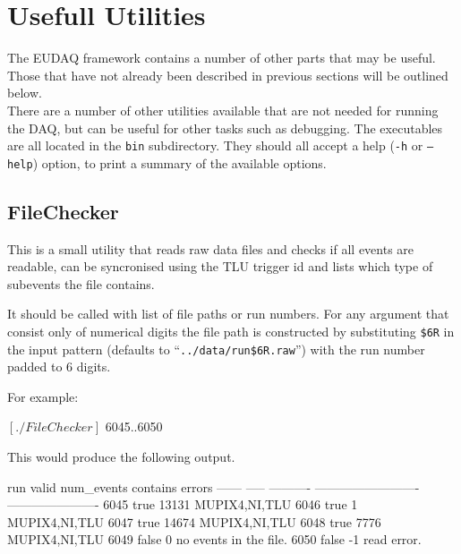 \section{Usefull Utilities}
The EUDAQ framework contains a number of other parts that may be useful.
Those that have not already been described in previous sections will be outlined below.\\


There are a number of other utilities available that are not needed for running the DAQ,
but can be useful for other tasks such as debugging.
The executables are all located in the \texttt{bin} subdirectory.
They should all accept a help (\texttt{-h} or \texttt{--help}) option,
to print a summary of the available options.


\subsection{FileChecker}
\label{sec:FileChecker}

This is a small utility that reads raw data files and checks if all events are
readable, can be syncronised using the TLU trigger id and lists which type
of subevents the file contains.

It should be called with list of file paths or run numbers. For any argument
that consist only of numerical digits the file path is constructed by
substituting \texttt{\$6R} in the input pattern (defaults to
``\texttt{../data/run\$6R.raw}'') with the run number padded to 6 digits.

For example:
\begin{listing}[mybash]
$[./FileChecker]$ {6045..6050}
\end{listing}

This would produce the following output.
\begin{listing}[]
run     valid  num_events  contains                   errors                    
------  -----  ----------  -------------------------  ----------------------
  6045   true       13131  MUPIX4,NI,TLU                                        
  6046   true           1  MUPIX4,NI,TLU                                        
  6047   true       14674  MUPIX4,NI,TLU                                        
  6048   true        7776  MUPIX4,NI,TLU                                        
  6049  false           0                             no events in the file.    
  6050  false          -1                             read error. 
\end{listing}


